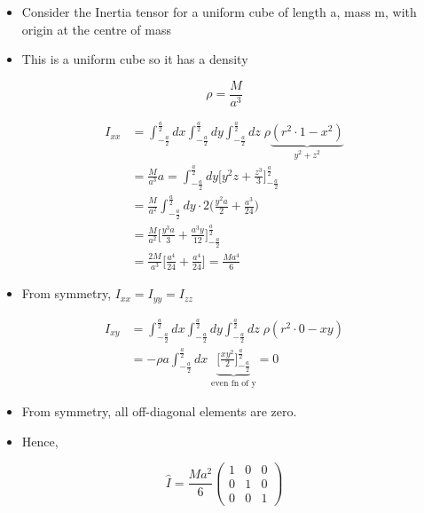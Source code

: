 \documentclass[a4paper,11pt,normalem]{article}
\begin{document}
\begin{example}

\begin{itemize}
\item
  Consider the Inertia tensor for a uniform cube of length a, mass m,
  with origin at the centre of mass
\item
  This is a uniform cube so it has a density
\end{itemize}

\[
    \rho = \frac{M}{a^3}
\]

\[
    \begin{aligned}
    I_{xx} &= \int_{-\frac{a}{2}}^{\frac{a}{2}} dx \int_{-\frac{a}{2}}^{\frac{a}{2}} dy \int_{-\frac{a}{2}}^{\frac{a}{2}} dz\; \rho\underbrace{(r^2 \cdot 1 - x^2)}_{y^2 + z^2} \\
    &= \frac{M}{a^3}a = \int_{-\frac{a}{2}}^{\frac{a}{2}} dy \Bigg[y^2z + \frac{z^3}{3}\Bigg]_{-\frac{a}{2}}^{\frac{a}{2}} \\
    &= \frac{M_{}}{a^2} \int_{-\frac{a}{2}}^{\frac{a}{2}} dy \cdot 2 \Bigg(\frac{y^2 a}{2} + \frac{a^3}{24}\Bigg) \\
    &= \frac{M}{a^2} \Bigg[\frac{y^3 a}{3} + \frac{a^3 y}{12} \Bigg]_{-\frac{a}{2}}^{\frac{a}{2}} \\
    &= \frac{2M_{}}{a^3} \Bigg[\frac{a^4}{24} + \frac{a^4}{24}\Bigg] = \frac{Ma^4}{6}
    \end{aligned}
\]

\begin{itemize}
\item
  From symmetry, \(I_{xx} = I_{yy} = I_{zz}\)
\end{itemize}

\[
    \begin{aligned}
    I_{xy} &= \int_{-\frac{a}{2}}^{\frac{a}{2}} dx \int_{-\frac{a}{2}}^{\frac{a}{2}} dy \int_{-\frac{a}{2}}^{\frac{a}{2}} dz\;\rho(r^2 \cdot 0 - xy) \\
    &= -\rho a \int_{-\frac{a}{2}}^{\frac{a}{2}} dx \; \underbrace{\Bigg[\frac{xy^2}{2}\Bigg]_{-\frac{a}{2}}^{\frac{a}{2}}}_{\text{even fn of y}} = 0
    \end{aligned}
\]

\begin{itemize}
\item
  From symmetry, all off-diagonal elements are zero.
\item
  Hence,
\end{itemize}

\[
    \hat{I} = \frac{Ma^2}{6}\begin{pmatrix} 1 & 0 & 0 \\ 0 & 1 & 0 \\ 0 & 0 & 1 \end{pmatrix}
\]


\end{example}
\end{document}
